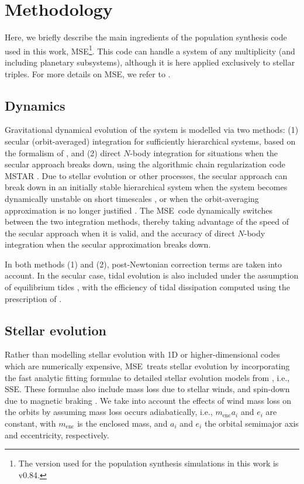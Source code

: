 \documentclass[twocolumn,appendixfloats,tighten]{aastex631}
\newcommand{\mse}{\textsc{MSE}}
\begin{document}
\section{Methodology}
\label{sect:meth}
Here, we briefly describe the main ingredients of the population synthesis code used in this work, \mse\footnote{The version used for the population synthesis simulations in this work is v0.84.}. This code can handle a system of any multiplicity (and including planetary subsystems), although it is here applied exclusively to stellar triples. For more details on \mse, we refer to \citet{2021MNRAS.502.4479H}.

\subsection{Dynamics}
\label{sect:meth:dyn}
Gravitational dynamical evolution of the system is modelled via two methods: (1) secular (orbit-averaged) integration for sufficiently hierarchical systems, based on the formalism of \citet{2016MNRAS.459.2827H,2018MNRAS.476.4139H,2020MNRAS.494.5492H}, and (2) direct $N$-body integration for situations when the secular approach breaks down, using the algorithmic chain regularization code \textsc{MSTAR} \citep{2020MNRAS.492.4131R}. Due to stellar evolution or other processes, the secular approach can break down in an initially stable hierarchical system when the system becomes dynamically unstable on short timescales \citep[e.g.,][]{2012ApJ...760...99P,2021arXiv210713620H,2021arXiv210804272T}, or when the orbit-averaging approximation is no longer justified \citep[e.g.,][]{2012ApJ...757...27A,2014ApJ...781...45A,2016MNRAS.458.3060L,2018MNRAS.481.4907G,2018MNRAS.481.4602L,2019MNRAS.490.4756L,2020MNRAS.494.5492H}. The \mse~code dynamically switches between the two integration methods, thereby taking advantage of the speed of the secular approach when it is valid, and the accuracy of direct $N$-body integration when the secular approximation breaks down.

In both methods (1) and (2), post-Newtonian correction terms are taken into account. In the secular case, tidal evolution is also included under the assumption of equilibrium tides \citep{1981A&A....99..126H,1998ApJ...499..853E}, with the efficiency of tidal dissipation computed using the prescription of \citet{2002MNRAS.329..897H}.


\subsection{Stellar evolution}
\label{sect:meth:stel}
Rather than modelling stellar evolution with 1D or higher-dimensional codes which are numerically expensive, \mse~treats stellar evolution by incorporating the fast analytic fitting formulae to detailed stellar evolution models from \citet{2000MNRAS.315..543H}, i.e., \textsc{SSE}. These formulae also include mass loss due to stellar winds, and spin-down due to magnetic braking \citep{1983ApJ...275..713R}. We take into account the effects of wind mass loss on the orbits by assuming mass loss occurs adiabatically, i.e., $m_\mathrm{enc} a_i$ and $e_i$ are constant, with $m_\mathrm{enc}$ is the enclosed mass, and $a_i$ and $e_i$ the orbital semimajor axis and eccentricity, respectively. 
\end{document}
